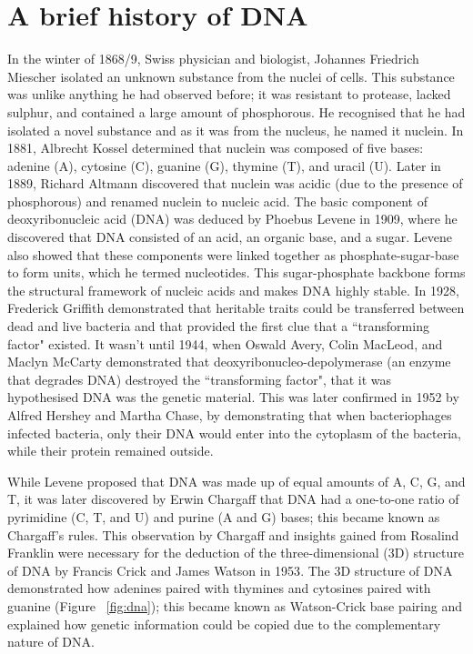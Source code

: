 \section{A brief history of DNA}

In the winter of 1868/9, Swiss physician and biologist, Johannes Friedrich Miescher isolated an unknown substance from the nuclei of cells\cite{dahm2008discovering}. This substance was unlike anything he had observed before; it was resistant to protease, lacked sulphur, and contained a large amount of phosphorous. He recognised that he had isolated a novel substance and as it was from the nucleus, he named it nuclein. In 1881, Albrecht Kossel determined that nuclein was composed of five bases: adenine (A), cytosine (C), guanine (G), thymine (T), and uracil (U). Later in 1889, Richard Altmann discovered that nuclein was acidic (due to the presence of phosphorous) and renamed nuclein to nucleic acid. The basic component of deoxyribonucleic acid (DNA) was deduced by Phoebus Levene in 1909, where he discovered that DNA consisted of an acid, an organic base, and a sugar. Levene also showed that these components were linked together as phosphate-sugar-base to form units, which he termed nucleotides. This sugar-phosphate backbone forms the structural framework of nucleic acids and makes DNA highly stable. In 1928, Frederick Griffith demonstrated that heritable traits could be transferred between dead and live bacteria and that provided the first clue that a ``transforming factor" existed\cite{griffith1928significance}. It wasn't until 1944, when Oswald Avery, Colin MacLeod, and Maclyn McCarty demonstrated that deoxyribonucleo-depolymerase (an enzyme that degrades DNA) destroyed the ``transforming factor", that it was hypothesised DNA was the genetic material\cite{avery1944studies}. This was later confirmed in 1952 by Alfred Hershey and Martha Chase, by demonstrating that when bacteriophages infected bacteria, only their DNA would enter into the cytoplasm of the bacteria, while their protein remained outside\cite{hershey1952independent}.

While Levene proposed that DNA was made up of equal amounts of A, C, G, and T, it was later discovered by Erwin Chargaff that DNA had a one-to-one ratio of pyrimidine (C, T, and U) and purine (A and G) bases\cite{pmid14938364, pmid14945441}; this became known as Chargaff's rules. This observation by Chargaff and insights gained from Rosalind Franklin were necessary for the deduction of the three-dimensional (3D) structure of DNA by Francis Crick and James Watson in 1953\cite{WATSON_1953}. The 3D structure of DNA demonstrated how adenines paired with thymines and cytosines paired with guanine (Figure ~\ref{fig:dna}); this became known as Watson-Crick base pairing and explained how genetic information could be copied due to the complementary nature of DNA.


